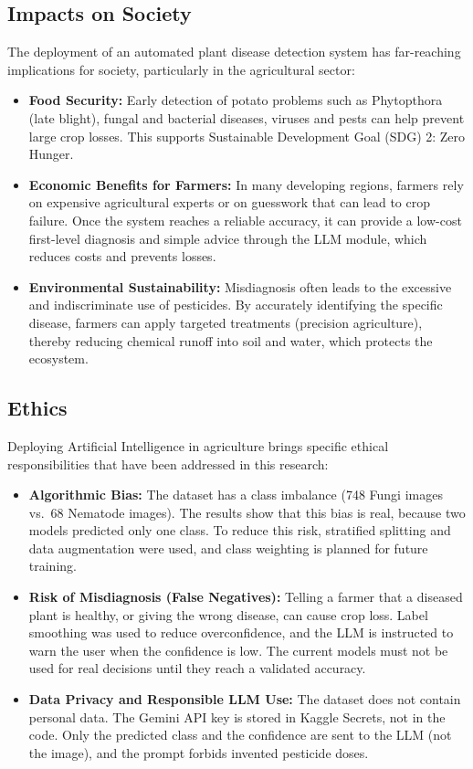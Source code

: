 \subsection{Impacts on Society}
The deployment of an automated plant disease detection system has far-reaching implications for society, particularly in the agricultural sector:
\begin{itemize}
    \item \textbf{Food Security:} Early detection of potato problems such as Phytopthora (late blight), fungal and bacterial diseases, viruses and pests can help prevent large crop losses. This supports Sustainable Development Goal (SDG) 2: Zero Hunger.
    \item \textbf{Economic Benefits for Farmers:} In many developing regions, farmers rely on expensive agricultural experts or on guesswork that can lead to crop failure. Once the system reaches a reliable accuracy, it can provide a low-cost first-level diagnosis and simple advice through the LLM module, which reduces costs and prevents losses.
    \item \textbf{Environmental Sustainability:} Misdiagnosis often leads to the excessive and indiscriminate use of pesticides. By accurately identifying the specific disease, farmers can apply targeted treatments (precision agriculture), thereby reducing chemical runoff into soil and water, which protects the ecosystem.
\end{itemize}

\subsection{Ethics}
Deploying Artificial Intelligence in agriculture brings specific ethical responsibilities that have been addressed in this research:
\begin{itemize}
    \item \textbf{Algorithmic Bias:} The dataset has a class imbalance (748 Fungi images vs.\ 68 Nematode images). The results show that this bias is real, because two models predicted only one class. To reduce this risk, stratified splitting and data augmentation were used, and class weighting is planned for future training.
    \item \textbf{Risk of Misdiagnosis (False Negatives):} Telling a farmer that a diseased plant is healthy, or giving the wrong disease, can cause crop loss. Label smoothing was used to reduce overconfidence, and the LLM is instructed to warn the user when the confidence is low. The current models must not be used for real decisions until they reach a validated accuracy.
    \item \textbf{Data Privacy and Responsible LLM Use:} The dataset does not contain personal data. The Gemini API key is stored in Kaggle Secrets, not in the code. Only the predicted class and the confidence are sent to the LLM (not the image), and the prompt forbids invented pesticide doses.
\end{itemize}

